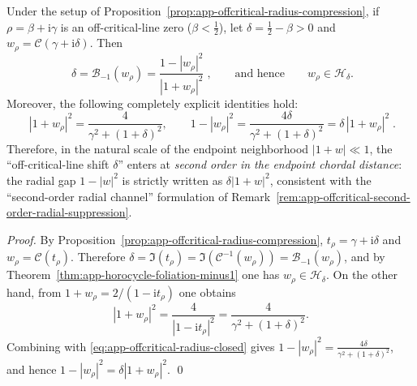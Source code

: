 \begin{corollary}\label{cor:app-offcritical-horocycle-busemann}
Under the setup of Proposition~\ref{prop:app-offcritical-radius-compression}, if \(\rho=\beta+\mathrm{i}\gamma\) is an off-critical-line zero (\(\beta<\tfrac12\)), let \(\delta=\tfrac12-\beta>0\) and \(w_{\rho}=\mathcal{C}(\gamma+\mathrm{i}\delta)\).
Then
\[
\boxed{\;\delta=\mathcal{B}_{-1}(w_{\rho})=\frac{1-|w_{\rho}|^{2}}{|1+w_{\rho}|^{2}}\;},
\qquad\text{and hence}\qquad
w_{\rho}\in\mathcal{H}_{\delta}.
\]
Moreover, the following completely explicit identities hold:
\[
\boxed{\;
|1+w_{\rho}|^{2}=\frac{4}{\gamma^{2}+(1+\delta)^{2}},
\qquad
1-|w_{\rho}|^{2}=\frac{4\delta}{\gamma^{2}+(1+\delta)^{2}}
=\delta\,|1+w_{\rho}|^{2}\; }.
\]
Therefore, in the natural scale of the endpoint neighborhood \(|1+w|\ll 1\), the ``off-critical-line shift \(\delta\)'' enters at \emph{second order in the endpoint chordal distance}: the radial gap \(1-|w|^{2}\) is strictly written as \(\delta|1+w|^{2}\), consistent with the ``second-order radial channel'' formulation of Remark~\ref{rem:app-offcritical-second-order-radial-suppression}.
\end{corollary}

\begin{proof}
By Proposition~\ref{prop:app-offcritical-radius-compression}, \(t_{\rho}=\gamma+\mathrm{i}\delta\) and \(w_{\rho}=\mathcal{C}(t_{\rho})\).
Therefore \(\delta=\Im(t_{\rho})=\Im(\mathcal{C}^{-1}(w_{\rho}))=\mathcal{B}_{-1}(w_{\rho})\), and by Theorem~\ref{thm:app-horocycle-foliation-minus1} one has \(w_{\rho}\in\mathcal{H}_{\delta}\).
On the other hand, from \(1+w_{\rho}=2/(1-\mathrm{i}t_{\rho})\) one obtains
\[
|1+w_{\rho}|^{2}=\frac{4}{|1-\mathrm{i}t_{\rho}|^{2}}
=\frac{4}{\gamma^{2}+(1+\delta)^{2}}.
\]
Combining with \eqref{eq:app-offcritical-radius-closed} gives
\(
1-|w_{\rho}|^{2}=\frac{4\delta}{\gamma^{2}+(1+\delta)^{2}}
\), and hence \(1-|w_{\rho}|^{2}=\delta|1+w_{\rho}|^{2}\). \qed
\end{proof}

